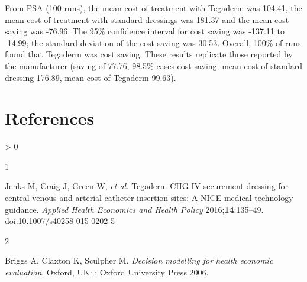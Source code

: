 \documentclass[
]{article}
\newlength{\cslhangindent}
\newlength{\csllabelwidth}
\newenvironment{CSLReferences}[2] %
 {%
  \setlength{\parindent}{0pt}
  \ifodd #1 \everypar{\setlength{\hangindent}{\cslhangindent}}\ignorespaces\fi
  \ifnum #2 > 0
  \setlength{\parskip}{#2\baselineskip}
  \fi
 }%
 {}
\newcommand{\CSLLeftMargin}[1]{\parbox[t]{\csllabelwidth}{#1}}
\newcommand{\CSLRightInline}[1]{\parbox[t]{\linewidth - \csllabelwidth}{#1}\break}
\begin{document}
From PSA (100 runs), the mean cost of treatment with Tegaderm was
104.41, the mean cost of treatment with standard dressings was 181.37
and the mean cost saving was -76.96. The 95\% confidence interval for
cost saving was -137.11 to -14.99; the standard deviation of the cost
saving was 30.53. Overall, 100\% of runs found that Tegaderm was cost
saving. These results replicate those reported by the manufacturer
(saving of 77.76, 98.5\% cases cost saving; mean cost of standard
dressing 176.89, mean cost of Tegaderm 99.63).

\hypertarget{references}{%
\section*{References}\label{references}}

\hypertarget{refs}{}
\begin{CSLReferences}{0}{0}
\leavevmode\hypertarget{ref-jenks2016}{}%
\CSLLeftMargin{1 }
\CSLRightInline{Jenks M, Craig J, Green W, \emph{et al.} Tegaderm {CHG}
{IV} securement dressing for central venous and arterial catheter
insertion sites: A {NICE} medical technology guidance. \emph{Applied
Health Economics and Health Policy} 2016;\textbf{14}:135--49.
doi:\href{https://doi.org/10.1007/s40258-015-0202-5}{10.1007/s40258-015-0202-5}}

\leavevmode\hypertarget{ref-briggs2006}{}%
\CSLLeftMargin{2 }
\CSLRightInline{Briggs A, Claxton K, Sculpher M. \emph{Decision
modelling for health economic evaluation}. Oxford, {UK}: : Oxford
University Press 2006. }

\end{CSLReferences}
\end{document}
